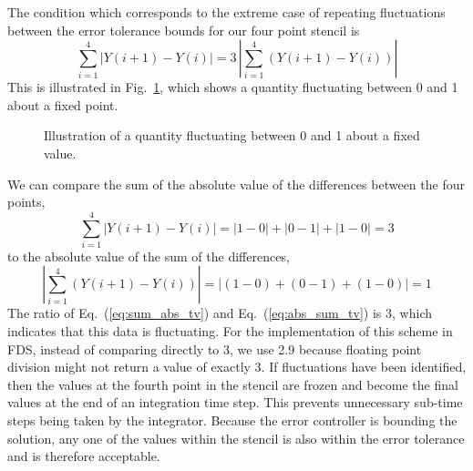 The condition which corresponds to the extreme case of repeating fluctuations between the error tolerance bounds for our four point stencil is
\begin{equation}\label{eq:TV}
\sum_{i=1}^{4}|Y(i+1)-Y(i)| = 3 \, |\sum_{i=1}^{4}(Y(i+1)-Y(i))|
\end{equation}
This is illustrated in Fig.~\ref{fig:TV}, which shows a quantity fluctuating between 0 and 1 about a fixed point.
\begin{figure}
\begin{center}
\caption[Illustration of a quantity fluctuating about a fixed point]{\label{fig:TV} Illustration of a quantity fluctuating between 0 and 1 about a fixed value.}
\end{center}
\end{figure}
We can compare the sum of the absolute value of the differences between the four points,
\begin{equation}\label{eq:sum_abs_tv}
\displaystyle \sum_{i=1}^{4}|Y(i+1)-Y(i)| = |1-0| + |0-1| + |1-0| = 3
\end{equation}
to the absolute value of the sum of the differences,
\begin{equation}\label{eq:abs_sum_tv}
|\displaystyle \sum_{i=1}^{4}(Y(i+1)-Y(i))| = |(1-0)+(0-1)+(1-0)| = 1
\end{equation}
The ratio of Eq.~(\ref{eq:sum_abs_tv}) and Eq.~(\ref{eq:abs_sum_tv}) is 3, which indicates that this data is fluctuating. For the implementation of this scheme in FDS, instead of comparing directly to 3, we use 2.9 because floating point division might not return a value of exactly 3. If fluctuations have been identified, then the values at the fourth point in the stencil are frozen and become the final values at the end of an integration time step. This prevents unnecessary sub-time steps being taken by the integrator. Because the error controller is bounding the solution, any one of the values within the stencil is also within the error tolerance and is therefore acceptable.

